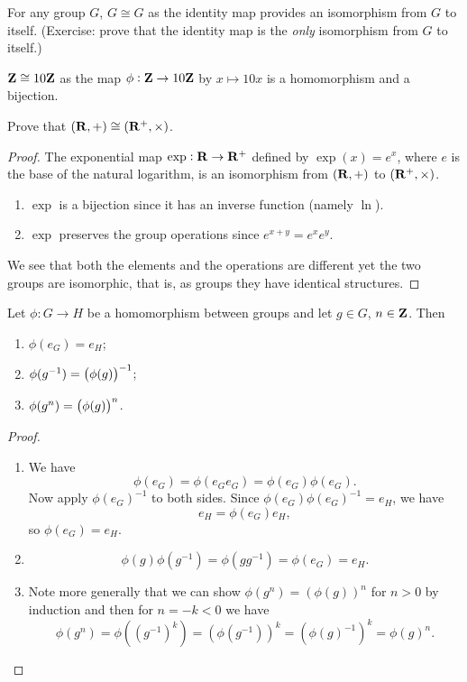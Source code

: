 \begin{example}
For any group $G$, $G\cong G$ as the identity map provides an isomorphism from $G$ to itself. (Exercise: prove that the identity map is the \emph{only} isomorphism from $G$ to itself.)

$\mathbf Z\cong10\mathbf Z$ as the map $\phi:\mathbf Z\to10\mathbf Z$ by $x\mapsto 10x$ is a homomorphism and a bijection.
\end{example}

\begin{exercise}
Prove that $(\mathbf R,+)\cong(\mathbf R^+,\times)$.
\end{exercise}

\begin{proof}
The exponential map $\exp:\mathbf R\to\mathbf R^+$ defined by $\exp(x)=e^x$, where $e$ is the base of the natural logarithm, is an isomorphism from $(\mathbf R,+)$ to $(\mathbf R^+,\times)$.
\begin{enumerate}[label=(\roman*)]
\item $\exp$ is a bijection since it has an inverse function (namely $\ln$).
\item $\exp$ preserves the group operations since $e^{x+y}=e^xe^y$.
\end{enumerate}

We see that both the elements and the operations are different yet the two groups are isomorphic, that is, as groups they have identical structures.
\end{proof}

\begin{proposition}
Let $\phi:G\to H$ be a homomorphism between groups and let $g\in G$, $n\in\mathbf Z$. Then
\begin{enumerate}[label=(\roman*)]
\item $\phi(e_G)=e_H$;
\item $\phi(g^{-1})=\left(\phi(g)\right)^{-1}$;
\item $\phi(g^n)=\left(\phi(g)\right)^n$.
\end{enumerate}
\end{proposition}

\begin{proof} \
\begin{enumerate}[label=(\roman*)]
\item We have
\[\phi(e_G)=\phi(e_G e_G)=\phi(e_G)\phi(e_G).\]
Now apply $\phi(e_G)^{-1}$ to both sides. Since $\phi(e_G)\phi(e_G)^{-1}=e_H$, we have
\[e_H=\phi(e_G)e_H,\]
so $\phi(e_G)=e_H$.

\item 
\[\phi(g)\phi(g^{-1})=\phi(gg^{-1})=\phi(e_G)=e_H.\]

\item Note more generally that we can show $\phi(g^n)=(\phi(g))^n$ for $n>0$ by induction and then for $n=-k<0$ we have
\[\phi(g^n)=\phi((g^{-1})^k)=(\phi(g^{-1}))^k=(\phi(g)^{-1})^k=\phi(g)^n.\]
\end{enumerate}
\end{proof}

